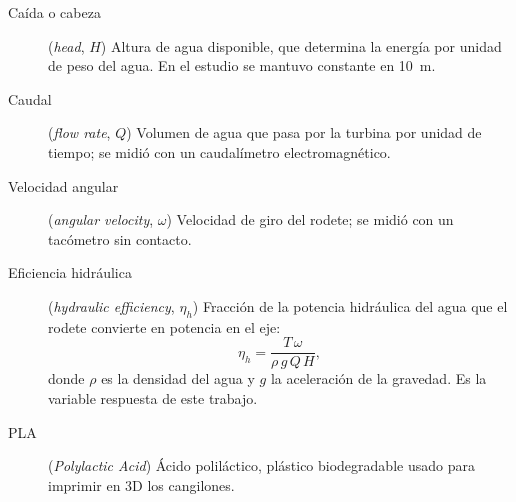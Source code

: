 \begin{description}
\item[Caída o cabeza] (\textit{head}, $H$) Altura de agua disponible, que determina la energía por unidad de peso del agua. En el estudio se mantuvo constante en 10~m.

\item[Caudal] (\textit{flow rate}, $Q$) Volumen de agua que pasa por la turbina por unidad de tiempo; se midió con un caudalímetro electromagnético.

\item[Velocidad angular] (\textit{angular velocity}, $\omega$) Velocidad de giro del rodete; se midió con un tacómetro sin contacto.

\item[Eficiencia hidráulica] (\textit{hydraulic efficiency}, $\eta_h$) Fracción de la potencia hidráulica del agua que el rodete convierte en potencia en el eje:
\[
\eta_h = \frac{T\,\omega}{\rho\, g\, Q\, H},
\]
donde $\rho$ es la densidad del agua y $g$ la aceleración de la gravedad. Es la variable respuesta de este trabajo.

\item[PLA] (\textit{Polylactic Acid}) Ácido poliláctico, plástico biodegradable usado para imprimir en 3D los cangilones.

\end{description}
